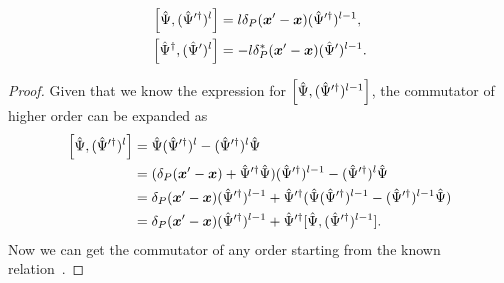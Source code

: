 \begin{lemma}
\begin{equation*}
\begin{split}
	\left[ \hat{\Psi}, ( \hat{\Psi}^{\prime\dagger} )^l \right]
	& = l \delta_P (\boldsymbol{x}^\prime - \boldsymbol{x}) ( \hat{\Psi}^{\prime\dagger} )^{l-1}, \\
	\left[ \hat{\Psi}^\dagger, ( \hat{\Psi}^\prime )^l \right]
	& = - l \delta_P^* (\boldsymbol{x}^\prime - \boldsymbol{x}) ( \hat{\Psi}^\prime )^{l-1}.
\end{split}
\end{equation*}
\end{lemma}
\begin{proof}
Given that we know the expression for $\left[ \hat{\Psi}, ( \hat{\Psi}^{\prime\dagger} )^{l-1} \right]$,
the commutator of higher order can be expanded as
\begin{equation*}
\begin{split}
	\left[ \hat{\Psi}, ( \hat{\Psi}^{\prime\dagger} )^l \right]
	& = \hat{\Psi} ( \hat{\Psi}^{\prime\dagger} )^l - ( \hat{\Psi}^{\prime\dagger} )^l \hat{\Psi} \\
	& = (
		\delta_P (\boldsymbol{x}^\prime - \boldsymbol{x}) + \hat{\Psi}^{\prime\dagger} \hat{\Psi}
	) ( \hat{\Psi}^{\prime\dagger} )^{l-1}
	- ( \hat{\Psi}^{\prime\dagger} )^l \hat{\Psi} \\
	& = \delta_P (\boldsymbol{x}^\prime - \boldsymbol{x}) ( \hat{\Psi}^{\prime\dagger} )^{l-1}
	+ \hat{\Psi}^{\prime\dagger} (
		\hat{\Psi} ( \hat{\Psi}^{\prime\dagger} )^{l-1}
		- ( \hat{\Psi}^{\prime\dagger} )^{l-1} \hat{\Psi}
	) \\
	& = \delta_P (\boldsymbol{x}^\prime - \boldsymbol{x}) ( \hat{\Psi}^{\prime\dagger} )^{l-1}
	+ \hat{\Psi}^{\prime\dagger} [
		\hat{\Psi}, ( \hat{\Psi}^{\prime\dagger} )^{l-1}
	].
\end{split}
\end{equation*}
Now we can get the commutator of any order starting from the known relation~.
\end{proof}

